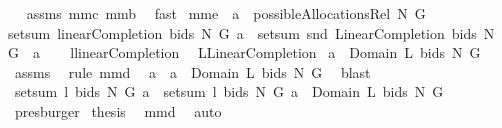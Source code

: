 \begin{isabellebody}
\isadelimproof
\ %
\endisadelimproof
%
\isatagproof
{}\isamarkupfalse%
\ assms\ mm{}{}c\ mm{}{}b\ \isamarkupfalse%
\ fast%
\endisatagproof
{\isafoldproof}%
%
\isadelimproof
%
\endisadelimproof
\isanewline
\isanewline
{}\isamarkupfalse%
\ mm{}{}e{\isacharcolon}\ \ {\isachardoublequoteopen}a\ {\isasymin}\ possibleAllocationsRel\ N\ G{\isachardoublequoteclose}\ \ \isanewline
{\isachardoublequoteopen}setsum\ {\isacharparenleft}linearCompletion{\isacharprime}\ bids\ N\ G{\isacharparenright}\ a\ {\isacharequal}\ setsum\ snd\ {\isacharparenleft}{\isacharparenleft}LinearCompletion\ bids\ N\ G{\isacharparenright}\ {\isacharbar}{\isacharbar}\ a{\isacharparenright}{\isachardoublequoteclose}\ \isanewline
%
\isadelimproof
%
\endisadelimproof
%
\isatagproof
{}\isamarkupfalse%
\ {\isacharminus}\isanewline
{}\isamarkupfalse%
\ {\isacharquery}l{\isacharequal}linearCompletion{\isacharprime}\ \isamarkupfalse%
\ {\isacharquery}L{\isacharequal}LinearCompletion\isanewline
{}\isamarkupfalse%
\ {\isachardoublequoteopen}a\ {\isasymsubseteq}\ Domain\ {\isacharparenleft}{\isacharquery}L\ bids\ N\ G{\isacharparenright}{\isachardoublequoteclose}\ \isamarkupfalse%
\ assms\ \isamarkupfalse%
\ {\isacharparenleft}rule\ mm{}{}d{\isacharparenright}\ \isamarkupfalse%
\isanewline
{}\isamarkupfalse%
\ {\isachardoublequoteopen}a\ {\isacharequal}\ a\ {\isasyminter}\ Domain\ {\isacharparenleft}{\isacharquery}L\ bids\ N\ G{\isacharparenright}{\isachardoublequoteclose}\ \isamarkupfalse%
\ blast\ \isamarkupfalse%
\isanewline
{}\isamarkupfalse%
\ {\isachardoublequoteopen}setsum\ {\isacharparenleft}{\isacharquery}l\ bids\ N\ G{\isacharparenright}\ a\ {\isacharequal}\ setsum\ {\isacharparenleft}{\isacharquery}l\ bids\ N\ G{\isacharparenright}\ {\isacharparenleft}a\ {\isasyminter}\ Domain\ {\isacharparenleft}{\isacharquery}L\ bids\ N\ G{\isacharparenright}{\isacharparenright}{\isachardoublequoteclose}\ \isamarkupfalse%
\ presburger\isanewline
{}\isamarkupfalse%
\ {\isacharquery}thesis\ \isamarkupfalse%
\ mm{}{}d\ \isamarkupfalse%
\ auto\isanewline
{}\isamarkupfalse%
%
\endisatagproof
{\isafoldproof}%
%
\isadelimproof
\isanewline
%
\endisadelimproof
\isanewline

\end{isabellebody}
